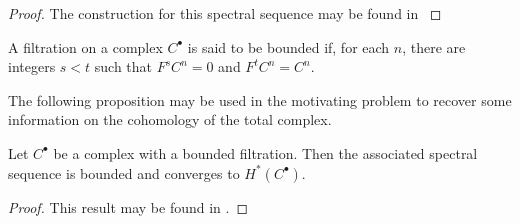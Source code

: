 \begin{proof}
  The construction for this spectral sequence may be found in \cite[Chapter 5]{weibel1995introduction}
\end{proof}
\begin{definition}
  A filtration on a complex $C^\bullet$ is said to be bounded
 if, for each $n$, there are integers $s<t$ such that $F^s C^n = 0$ and $F^t C^n = C^n$.
\end{definition}
The following proposition may be used in the motivating problem to recover some information on the cohomology of the total complex.
 \begin{proposition}\label{prop: FiltrationSpectral}
   Let $C^\bullet$ be a complex with a bounded filtration.
   Then the associated spectral sequence is bounded and converges to $H^*(C^\bullet)$.
 \end{proposition}
 \begin{proof}
   This result may be found in \cite[Chapter 5]{weibel1995introduction}.
 \end{proof}
